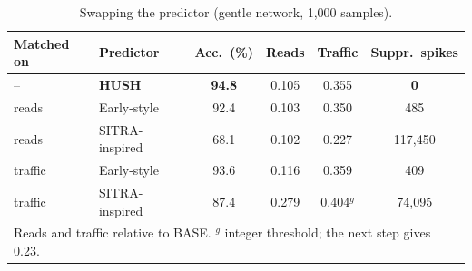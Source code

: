 \documentclass[conference]{IEEEtran}
\begin{document}
\begin{table}[t]\centering\caption{Swapping the predictor (gentle network, 1,000 samples).}\label{tab:heur}
\setlength{\tabcolsep}{2.5pt}\footnotesize
\begin{tabular}{llcccc}\toprule
Matched on & Predictor & Acc.\ (\%) & Reads & Traffic & Suppr.\ spikes\\\midrule
-- & \textbf{HUSH} & \textbf{94.8} & 0.105 & 0.355 & \textbf{0}\\
reads & Early-style & 92.4 & 0.103 & 0.350 & 485\\
reads & SITRA-inspired & 68.1 & 0.102 & 0.227 & 117,450\\
traffic & Early-style & 93.6 & 0.116 & 0.359 & 409\\
traffic & SITRA-inspired & 87.4 & 0.279 & 0.404$^g$ & 74,095\\\bottomrule
\multicolumn{6}{p{0.95\columnwidth}}{\footnotesize Reads and traffic relative to BASE. $^g$ integer threshold; the
next step gives 0.23.}
\end{tabular}\end{table}
\end{document}
